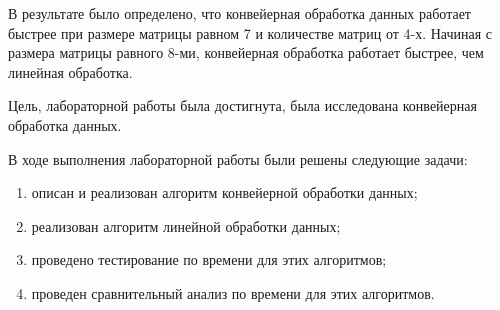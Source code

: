 \hspace{\parindent}В результате было определено, что конвейерная обработка данных работает быстрее при размере матрицы равном 7 и количестве матриц от 4-х. Начиная с размера матрицы равного 8-ми, конвейерная обработка работает быстрее, чем линейная обработка.

\hspace{\parindent}Цель, лабораторной работы была достигнута, была исследована конвейерная обработка данных.

В ходе выполнения лабораторной работы были решены следующие задачи:
\begin{enumerate}
	\item описан и реализован алгоритм конвейерной обработки данных;
	\item реализован алгоритм линейной обработки данных;
	\item проведено тестирование по времени для этих алгоритмов;
	\item проведен сравнительный анализ по времени для этих алгоритмов.
\end{enumerate}